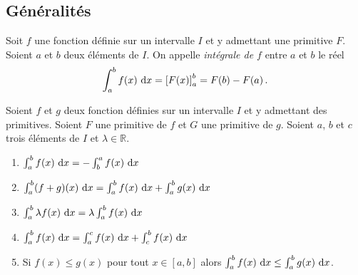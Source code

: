       \subsection{G\'en\'eralit\'es}
	      \begin{defi}
	      Soit $f$ une fonction d\'efinie sur un intervalle $I$ et y admettant une primitive $F$.
	      Soient $a$ et $b$ deux \'el\'ements de $I$.
	      On appelle \emph{int\'egrale de $f$} entre $a$ et $b$ le r\'eel 
	            \[
	            \int_{a}^{b} f(x) ~\mathrm{d}x = \left[ F(x) \right]_{a}^{b} = F(b) - F(a)      \,.
	            \]
	      \end{defi}
	      \begin{thm}
	      Soient $f$ et $g$ deux fonction d\'efinies sur un intervalle $I$ et y admettant des primitives.
	      Soient $F$ une primitive de $f$ et $G$ une primitive de $g$.
	      Soient $a$, $b$ et $c$ trois \'el\'ements de $I$ et $\lambda \in \mathbb{R}$.
	            \begin{enumerate}
	                  \item $\int_{a}^{b} f(x) ~\mathrm{d}x = -\int_{b}^{a} f(x) ~\mathrm{d}x$
	                  \item $\int_{a}^{b} (f+g) (x) ~\mathrm{d}x = \int_{a}^{b} f(x) ~\mathrm{d}x + \int_{a}^{b} g(x) ~\mathrm{d}x$
	                  \item $\int_{a}^{b} \lambda f(x) ~\mathrm{d}x = \lambda \int_{a}^{b} f(x) ~\mathrm{d}x$
	                  \item $\int_{a}^{b} f(x) ~\mathrm{d}x = \int_{a}^{c} f(x) ~\mathrm{d}x + \int_{c}^{b} f(x) ~\mathrm{d}x$
	                  \item Si $f(x) \leq g(x)$ pour tout $x\in [a,b]$ alors 
	                        $\int_{a}^{b} f(x) ~\mathrm{d}x \leq \int_{a}^{b} g(x) ~\mathrm{d}x$.            
	            \end{enumerate}
	      \end{thm}
